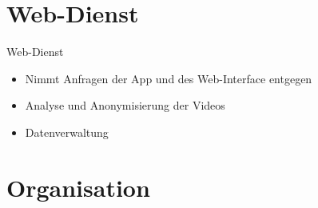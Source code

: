 \documentclass[19pt]{beamer}
\begin{document}
\section{Web-Dienst}
\begin{frame}{Web-Dienst}
	\begin{itemize}
		\item Nimmt Anfragen der App und des Web-Interface entgegen
		\pause
		\item Analyse und Anonymisierung der Videos
		\pause
		\item Datenverwaltung
	\end{itemize}
\end{frame}

\section{Organisation}
\end{document}
